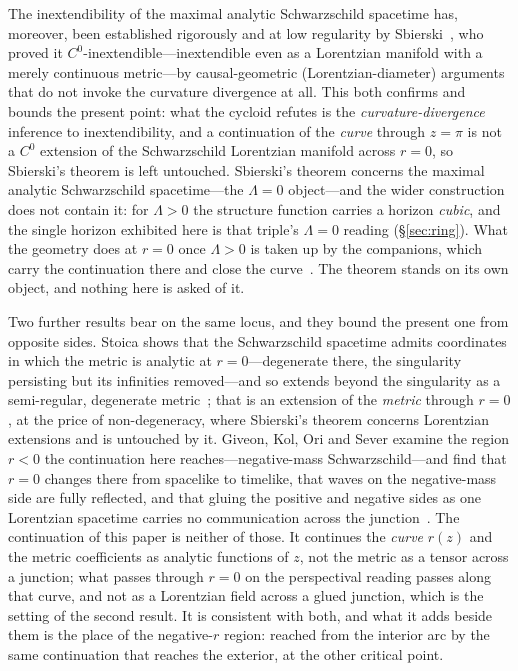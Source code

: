 \documentclass[11pt,a4paper]{article}
\theoremstyle{definition}
\begin{document}
The inextendibility of the maximal analytic Schwarzschild spacetime has, moreover, been established rigorously and at low regularity by Sbierski~\cite{sbierski2018}, who proved it $C^0$-inextendible---inextendible even as a Lorentzian manifold with a merely continuous metric---by causal-geometric (Lorentzian-diameter) arguments that do not invoke the curvature divergence at all. This both confirms and bounds the present point: what the cycloid refutes is the \emph{curvature-divergence} inference to inextendibility, and a continuation of the \emph{curve} through $z=\pi$ is not a $C^0$ extension of the Schwarzschild Lorentzian manifold across $r=0$, so Sbierski's theorem is left untouched. Sbierski's theorem concerns the maximal analytic Schwarzschild spacetime---the $\Lambda=0$ object---and the wider construction does not contain it: for $\Lambda>0$ the structure function carries a horizon \emph{cubic}, and the single horizon exhibited here is that triple's $\Lambda=0$ reading (\S\ref{sec:ring}). What the geometry does at $r=0$ once $\Lambda>0$ is taken up by the companions, which carry the continuation there and close the curve~\cite{JanzenSlicing,JanzenCRframework}. The theorem stands on its own object, and nothing here is asked of it.

Two further results bear on the same locus, and they bound the present one from opposite sides. Stoica shows that the Schwarzschild spacetime admits coordinates in which the metric is analytic at $r=0$---degenerate there, the singularity persisting but its infinities removed---and so extends beyond the singularity as a semi-regular, degenerate metric~\cite{Stoica2012}; that is an extension of the \emph{metric} through $r=0$, at the price of non-degeneracy, where Sbierski's theorem concerns Lorentzian extensions and is untouched by it. Giveon, Kol, Ori and Sever examine the region $r<0$ the continuation here reaches---negative-mass Schwarzschild---and find that $r=0$ changes there from spacelike to timelike, that waves on the negative-mass side are fully reflected, and that gluing the positive and negative sides as one Lorentzian spacetime carries no communication across the junction~\cite{GiveonKolOriSever2004}. The continuation of this paper is neither of those. It continues the \emph{curve} $r(z)$ and the metric coefficients as analytic functions of $z$, not the metric as a tensor across a junction; what passes through $r=0$ on the perspectival reading passes along that curve, and not as a Lorentzian field across a glued junction, which is the setting of the second result. It is consistent with both, and what it adds beside them is the place of the negative-$r$ region: reached from the interior arc by the same continuation that reaches the exterior, at the other critical point.
\end{document}
